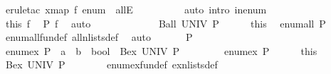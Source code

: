 \begin{isabellebody}
\ {\isacharparenleft}{\kern0pt}erule{\isacharunderscore}{\kern0pt}tac\ x{\isacharequal}{\kern0pt}{\isachardoublequoteopen}map\ f\ enum{\isachardoublequoteclose}\ \ allE{\isacharparenright}{\kern0pt}\isanewline
\ \ \ \ \ \ \ \ \isamarkupfalse%
\ {\isacharparenleft}{\kern0pt}auto\ intro{\isacharbang}{\kern0pt}{\isacharcolon}{\kern0pt}\ in{\isacharunderscore}{\kern0pt}enum{\isacharparenright}{\kern0pt}\isanewline
\ \ \ \ \ \ \ \ \isamarkupfalse%
\isanewline
\ \ \ \ \ \ \isamarkupfalse%
\ this\ f\ \isamarkupfalse%
\ {\isachardoublequoteopen}P\ f{\isachardoublequoteclose}\ \isamarkupfalse%
\ auto\isanewline
\ \ \ \ \isamarkupfalse%
\isanewline
\ \ \isamarkupfalse%
\isanewline
\ \ \ \ \isamarkupfalse%
\ {\isachardoublequoteopen}Ball\ UNIV\ P{\isachardoublequoteclose}\isanewline
\ \ \ \ \isamarkupfalse%
\ this\ \isamarkupfalse%
\ {\isachardoublequoteopen}enum{\isacharunderscore}{\kern0pt}all\ P{\isachardoublequoteclose}\isanewline
\ \ \ \ \ \ \isamarkupfalse%
\ enum{\isacharunderscore}{\kern0pt}all{\isacharunderscore}{\kern0pt}fun{\isacharunderscore}{\kern0pt}def\ all{\isacharunderscore}{\kern0pt}n{\isacharunderscore}{\kern0pt}lists{\isacharunderscore}{\kern0pt}def\ \isamarkupfalse%
\ auto\isanewline
\ \ \isamarkupfalse%
\isanewline
{}\isamarkupfalse%
\isanewline
\ \ \isamarkupfalse%
\ P\isanewline
\ \ \isamarkupfalse%
\ {\isachardoublequoteopen}enum{\isacharunderscore}{\kern0pt}ex\ {\isacharparenleft}{\kern0pt}P\ {\isacharcolon}{\kern0pt}{\isacharcolon}{\kern0pt}\ {\isacharparenleft}{\kern0pt}{\isacharprime}{\kern0pt}a\ {\isasymRightarrow}\ {\isacharprime}{\kern0pt}b{\isacharparenright}{\kern0pt}\ {\isasymRightarrow}\ bool{\isacharparenright}{\kern0pt}\ {\isacharequal}{\kern0pt}\ Bex\ UNIV\ P{\isachardoublequoteclose}\isanewline
\ \ \isamarkupfalse%
\isanewline
\ \ \ \ \isamarkupfalse%
\ {\isachardoublequoteopen}enum{\isacharunderscore}{\kern0pt}ex\ P{\isachardoublequoteclose}\isanewline
\ \ \ \ \isamarkupfalse%
\ this\ \isamarkupfalse%
\ {\isachardoublequoteopen}Bex\ UNIV\ P{\isachardoublequoteclose}\isanewline
\ \ \ \ \ \ \isamarkupfalse%
\ enum{\isacharunderscore}{\kern0pt}ex{\isacharunderscore}{\kern0pt}fun{\isacharunderscore}{\kern0pt}def\ ex{\isacharunderscore}{\kern0pt}n{\isacharunderscore}{\kern0pt}lists{\isacharunderscore}{\kern0pt}def\ \isamarkupfalse%

\end{isabellebody}
